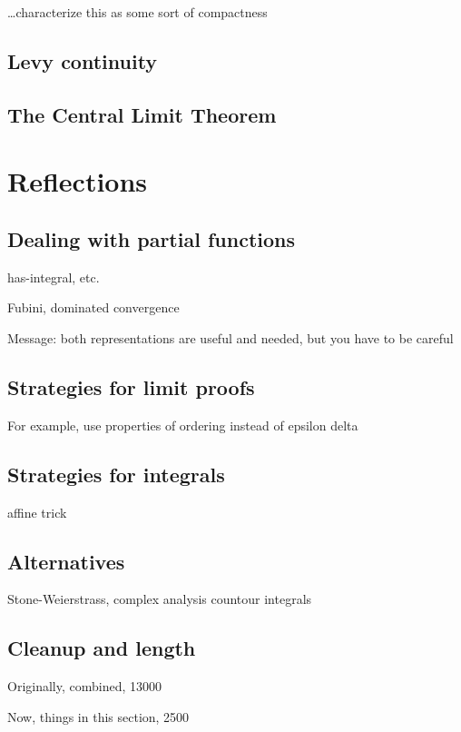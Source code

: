 \documentclass{svjour3}
\begin{document}
\ldots characterize this as some sort of compactness

\subsection{Levy continuity}


\subsection{The Central Limit Theorem}


\section{Reflections}
\label{section:reflections}

\subsection{Dealing with partial functions}

has-integral, etc.

Fubini, dominated convergence

Message: both representations are useful and needed, but you have to be careful

\subsection{Strategies for limit proofs}

For example, use properties of ordering instead of epsilon delta

\subsection{Strategies for integrals}

affine trick

\subsection{Alternatives}

Stone-Weierstrass, complex analysis countour integrals

\subsection{Cleanup and length}

Originally, combined, 13000

Now, things in this section, 2500
\end{document}

